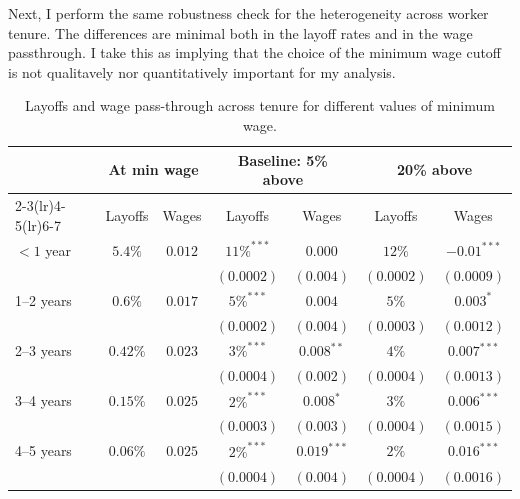Next, I perform the same robustness check for the heterogeneity across worker tenure. The differences are minimal both in the layoff rates and in the wage passthrough. I take this as implying that the choice of the minimum wage cutoff is not qualitavely nor quantitatively important for my analysis.
\begin{table}
  \centering
  \begin{tabular}{lcccccc}
    \toprule
    & \multicolumn{2}{c}{At min wage} & \multicolumn{2}{c}{Baseline: 5\% above} & \multicolumn{2}{c}{20\% above}\\
    \cmidrule(lr){2-3}\cmidrule(lr){4-5}\cmidrule(lr){6-7}
    & Layoffs & Wages & Layoffs & Wages & Layoffs & Wages \\
    \midrule
    \hline
    $<\!1$ year      &  $5.4\%$  &  $0.012$    &  $11\%^{***}$    &  $0.000$             &  $12\%$              &  $-0.01^{***}$ \\  
                     &           &             &  $(0.0002)$ &  $(0.004)$           & $(0.0002)$           &   $(0.0009)$   \\
    \hline
    1–2 years        &  $0.6\%$   &  $0.017$    &  $5\%^{***}$     &  $0.004$            &  $5\%$       &  $0.003^{*}$     \\  
                     &            &             &  $(0.0002)$& $(0.004)$           &  $(0.0003)$  &   $(0.0012)$   \\
    \hline

    2–3 years        &  $0.42\%$ &  $0.023$    &  $3\%^{***}$   &  $0.008^{**}$  &  $4\%$   &  $0.007^{***}$ \\
                    &            &             &   $(0.0004)$ & $(0.002)$   &  $(0.0004)$ &   $(0.0013)$   \\
    \hline
    
    3–4 years        &  $0.15\%$  &  $0.025$  &  $2\%^{***}$  &  $0.008^*$  &  $3\%$      &  $0.006^{***}$ \\
                     &            &            &   $(0.0003)$ &   $(0.003)$  &  $(0.0004)$&   $(0.0015)$   \\ 
    \hline    
    4–5 years        &  $0.06\%$  &  $0.025$   &  $2\%^{***}$      &  $0.019^{***}$ &  $2\%$      &  $0.016^{***}$ \\
                     &            &            &   $(0.0004)$& $(0.004)$   &  $(0.0004)$ &   $(0.0016)$   \\
    \hline
  \end{tabular}
  \caption{Layoffs and wage pass-through across tenure for different values of minimum wage.}
  \label{tab:minwage_control_tenure}
\end{table}

